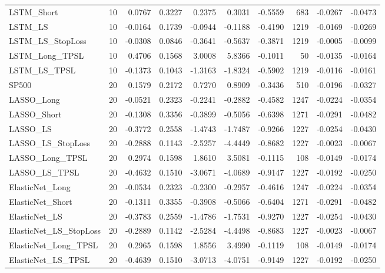 \begin{tabular}{llrrrrrrrr}
\cline{1-10}
LSTM\_Short & 10 & 0.0767 & 0.3227 & 0.2375 & 0.3031 & -0.5559 & 683 & -0.0267 & -0.0473 \\
\cline{1-10}
LSTM\_LS & 10 & -0.0164 & 0.1739 & -0.0944 & -0.1188 & -0.4190 & 1219 & -0.0169 & -0.0269 \\
\cline{1-10}
LSTM\_LS\_StopLoss & 10 & -0.0308 & 0.0846 & -0.3641 & -0.5637 & -0.3871 & 1219 & -0.0005 & -0.0099 \\
\cline{1-10}
LSTM\_Long\_TPSL & 10 & 0.4706 & 0.1568 & 3.0008 & 5.8366 & -0.1011 & 50 & -0.0135 & -0.0164 \\
\cline{1-10}
LSTM\_LS\_TPSL & 10 & -0.1373 & 0.1043 & -1.3163 & -1.8324 & -0.5902 & 1219 & -0.0116 & -0.0161 \\
\cline{1-10}
SP500 & 20 & 0.1579 & 0.2172 & 0.7270 & 0.8909 & -0.3436 & 510 & -0.0196 & -0.0327 \\
\cline{1-10}
LASSO\_Long & 20 & -0.0521 & 0.2323 & -0.2241 & -0.2882 & -0.4582 & 1247 & -0.0224 & -0.0354 \\
\cline{1-10}
LASSO\_Short & 20 & -0.1308 & 0.3356 & -0.3899 & -0.5056 & -0.6398 & 1271 & -0.0291 & -0.0482 \\
\cline{1-10}
LASSO\_LS & 20 & -0.3772 & 0.2558 & -1.4743 & -1.7487 & -0.9266 & 1227 & -0.0254 & -0.0430 \\
\cline{1-10}
LASSO\_LS\_StopLoss & 20 & -0.2888 & 0.1143 & -2.5257 & -4.4449 & -0.8682 & 1227 & -0.0023 & -0.0067 \\
\cline{1-10}
LASSO\_Long\_TPSL & 20 & 0.2974 & 0.1598 & 1.8610 & 3.5081 & -0.1115 & 108 & -0.0149 & -0.0174 \\
\cline{1-10}
LASSO\_LS\_TPSL & 20 & -0.4632 & 0.1510 & -3.0671 & -4.0689 & -0.9147 & 1227 & -0.0192 & -0.0250 \\
\cline{1-10}
ElasticNet\_Long & 20 & -0.0534 & 0.2323 & -0.2300 & -0.2957 & -0.4616 & 1247 & -0.0224 & -0.0354 \\
\cline{1-10}
ElasticNet\_Short & 20 & -0.1311 & 0.3355 & -0.3908 & -0.5066 & -0.6404 & 1271 & -0.0291 & -0.0482 \\
\cline{1-10}
ElasticNet\_LS & 20 & -0.3783 & 0.2559 & -1.4786 & -1.7531 & -0.9270 & 1227 & -0.0254 & -0.0430 \\
\cline{1-10}
ElasticNet\_LS\_StopLoss & 20 & -0.2889 & 0.1142 & -2.5284 & -4.4498 & -0.8683 & 1227 & -0.0023 & -0.0067 \\
\cline{1-10}
ElasticNet\_Long\_TPSL & 20 & 0.2965 & 0.1598 & 1.8556 & 3.4990 & -0.1119 & 108 & -0.0149 & -0.0174 \\
\cline{1-10}
ElasticNet\_LS\_TPSL & 20 & -0.4639 & 0.1510 & -3.0713 & -4.0751 & -0.9149 & 1227 & -0.0192 & -0.0250 \\

\end{tabular}
